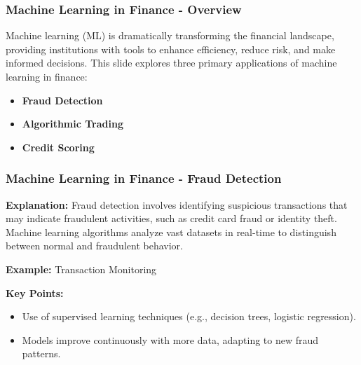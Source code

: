 \documentclass[aspectratio=169]{beamer}
\begin{document}
\begin{frame}[fragile]
    \frametitle{Machine Learning in Finance - Overview}
    Machine learning (ML) is dramatically transforming the financial landscape, providing institutions with tools to enhance efficiency, reduce risk, and make informed decisions. This slide explores three primary applications of machine learning in finance:
    \begin{itemize}
        \item \textbf{Fraud Detection}
        \item \textbf{Algorithmic Trading}
        \item \textbf{Credit Scoring}
    \end{itemize}
\end{frame}

\begin{frame}[fragile]
    \frametitle{Machine Learning in Finance - Fraud Detection}
    \textbf{Explanation:} Fraud detection involves identifying suspicious transactions that may indicate fraudulent activities, such as credit card fraud or identity theft. Machine learning algorithms analyze vast datasets in real-time to distinguish between normal and fraudulent behavior.

    \textbf{Example:} Transaction Monitoring
    
    \textbf{Key Points:}
    \begin{itemize}
        \item Use of supervised learning techniques (e.g., decision trees, logistic regression).
        \item Models improve continuously with more data, adapting to new fraud patterns.
    \end{itemize}
\end{frame}
\end{document}
